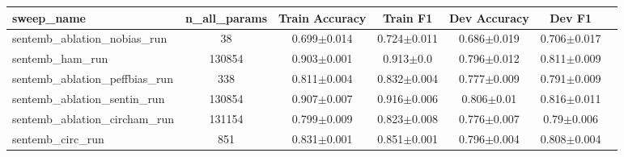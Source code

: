 \begin{tabular}{lcccccc}
\toprule
sweep_name & n_all_params & Train Accuracy & Train F1 & Dev Accuracy & Dev F1 \\
\midrule
sentemb_ablation_nobias_run & 38 & 0.699$\pm$0.014 & 0.724$\pm$0.011 & 0.686$\pm$0.019 & 0.706$\pm$0.017 \\
sentemb_ham_run & 130854 & 0.903$\pm$0.001 & 0.913$\pm$0.0 & 0.796$\pm$0.012 & 0.811$\pm$0.009 \\
sentemb_ablation_peffbias_run & 338 & 0.811$\pm$0.004 & 0.832$\pm$0.004 & 0.777$\pm$0.009 & 0.791$\pm$0.009 \\
sentemb_ablation_sentin_run & 130854 & 0.907$\pm$0.007 & 0.916$\pm$0.006 & 0.806$\pm$0.01 & 0.816$\pm$0.011 \\
sentemb_ablation_circham_run & 131154 & 0.799$\pm$0.009 & 0.823$\pm$0.008 & 0.776$\pm$0.007 & 0.79$\pm$0.006 \\
sentemb_circ_run & 851 & 0.831$\pm$0.001 & 0.851$\pm$0.001 & 0.796$\pm$0.004 & 0.808$\pm$0.004 \\
\bottomrule
\end{tabular}
